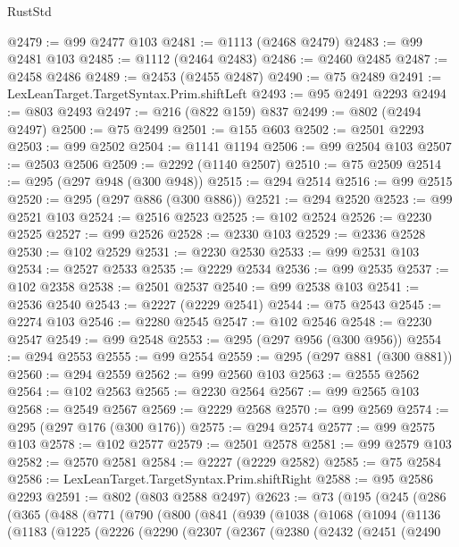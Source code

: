 \begin{lexlean}{RustStd}
\begin{coremodule}
@2479 := @99 @2477 @103
@2481 := @1113 (@2468 @2479)
@2483 := @99 @2481 @103
@2485 := @1112 (@2464 @2483)
@2486 := @2460 @2485
@2487 := @2458 @2486
@2489 := @2453 (@2455 @2487)
@2490 := @75 @2489
@2491 := LexLeanTarget.TargetSyntax.Prim.shiftLeft
@2493 := @95 @2491 @2293
@2494 := @803 @2493
@2497 := @216 (@822 @159) @837
@2499 := @802 (@2494 @2497)
@2500 := @75 @2499
@2501 := @155 @603
@2502 := @2501 @2293
@2503 := @99 @2502
@2504 := @1141 @1194
@2506 := @99 @2504 @103
@2507 := @2503 @2506
@2509 := @2292 (@1140 @2507)
@2510 := @75 @2509
@2514 := @295 (@297 @948 (@300 @948))
@2515 := @294 @2514
@2516 := @99 @2515
@2520 := @295 (@297 @886 (@300 @886))
@2521 := @294 @2520
@2523 := @99 @2521 @103
@2524 := @2516 @2523
@2525 := @102 @2524
@2526 := @2230 @2525
@2527 := @99 @2526
@2528 := @2330 @103
@2529 := @2336 @2528
@2530 := @102 @2529
@2531 := @2230 @2530
@2533 := @99 @2531 @103
@2534 := @2527 @2533
@2535 := @2229 @2534
@2536 := @99 @2535
@2537 := @102 @2358
@2538 := @2501 @2537
@2540 := @99 @2538 @103
@2541 := @2536 @2540
@2543 := @2227 (@2229 @2541)
@2544 := @75 @2543
@2545 := @2274 @103
@2546 := @2280 @2545
@2547 := @102 @2546
@2548 := @2230 @2547
@2549 := @99 @2548
@2553 := @295 (@297 @956 (@300 @956))
@2554 := @294 @2553
@2555 := @99 @2554
@2559 := @295 (@297 @881 (@300 @881))
@2560 := @294 @2559
@2562 := @99 @2560 @103
@2563 := @2555 @2562
@2564 := @102 @2563
@2565 := @2230 @2564
@2567 := @99 @2565 @103
@2568 := @2549 @2567
@2569 := @2229 @2568
@2570 := @99 @2569
@2574 := @295 (@297 @176 (@300 @176))
@2575 := @294 @2574
@2577 := @99 @2575 @103
@2578 := @102 @2577
@2579 := @2501 @2578
@2581 := @99 @2579 @103
@2582 := @2570 @2581
@2584 := @2227 (@2229 @2582)
@2585 := @75 @2584
@2586 := LexLeanTarget.TargetSyntax.Prim.shiftRight
@2588 := @95 @2586 @2293
@2591 := @802 (@803 @2588 @2497)
@2623 := @73
    (@195
      (@245
        (@286
          (@365
            (@488
              (@771
                (@790
                  (@800
                    (@841
                      (@939
                        (@1038
                          (@1068
                            (@1094
                              (@1136
                                (@1183
                                  (@1225
                                    (@2226
                                      (@2290
                                        (@2307
                                          (@2367
                                            (@2380
                                              (@2432
                                                (@2451
                                                  (@2490

\end{coremodule}
\end{lexlean}
